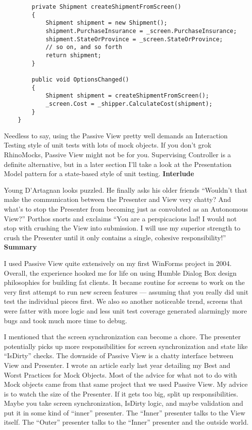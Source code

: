 \documentclass{article}
\begin{document}
{\begin{lstlisting}
        private Shipment createShipmentFromScreen()
        {
            Shipment shipment = new Shipment();
            shipment.PurchaseInsurance = _screen.PurchaseInsurance;
            shipment.StateOrProvince = _screen.StateOrProvince;
            // so on, and so forth
            return shipment;
        }
 
        public void OptionsChanged()
        {
            Shipment shipment = createShipmentFromScreen();
            _screen.Cost = _shipper.CalculateCost(shipment);
        }
    }
\end{lstlisting}

Needless to say, using the Passive View pretty well demands an Interaction Testing style of unit tests with lots of mock objects.  If you don't grok RhinoMocks, Passive View might not be for you.  Supervising Controller is a definite alternative, but in a later section I'll take a look at the Presentation Model pattern for a state-based style of unit testing.
\Large {\textbf{Interlude}}

Young D'Artagnan looks puzzled.  He finally asks his older friends “Wouldn't that make the communication between the Presenter and View very chatty?  And what's to stop the Presenter from becoming just as convoluted as an Autonomous View?”  Porthos snorts and exclaims “You are a perspicacious lad!  I would not stop with crushing the View into submission.  I will use my superior strength to crush the Presenter until it only contains a single, cohesive responsibility!”
\Large {\textbf{Summary}}

I used Passive View quite extensively on my first WinForms project in 2004.  Overall, the experience hooked me for life on using Humble Dialog Box design philosophies for building fat clients.  It became routine for screens to work on the very first attempt to run new screen features — assuming that you really did unit test the individual pieces first.  We also so another noticeable trend, screens that were fatter with more logic and less unit test coverage generated alarmingly more bugs and took much more time to debug.   

I mentioned that the screen synchronization can become a chore.  The presenter potentially picks up more responsibilities for screen synchronization and state like “IsDirty” checks.  The downside of Passive View is a chatty interface between View and Presenter.  I wrote an article early last year detailing my Best and Worst Practices for Mock Objects.  Most of the advice for what not to do with Mock objects came from that same project that we used Passive View.  My advice is to watch the size of the Presenter.  If it gets too big, split up responsibilities.  Maybe you take screen synchronization, IsDirty logic, and maybe validation and put it in some kind of “inner” presenter.  The “Inner” presenter talks to the View itself.  The “Outer” presenter talks to the “Inner” presenter and the outside world. 

}
\end{document}

